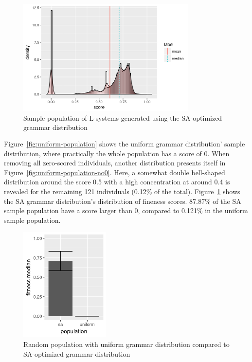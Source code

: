 \begin{figure}
    \centering
    \includegraphics[width=0.8\textwidth]{figures/sa-population}
    \caption[L-system population from SA grammar distribution]{Sample population of \glspl{L-system} generated using the \gls{SA}-optimized grammar distribution}
    \label{fig:sa-population}
\end{figure}

Figure~\ref{fig:uniform-population} shows the uniform grammar distribution' sample distribution, where practically the whole population has a score of 0.
When removing all zero-scored individuals, another distribution presents itself in Figure~\ref{fig:uniform-population-no0}.
Here, a somewhat double bell-shaped distribution around the score 0.5 with a high concentration at around 0.4 is revealed for the remaining 121 individuals (0.12\% of the total).
Figure~\ref{fig:sa-population} shows the \gls{SA} grammar distribution's distribution of fineness scores.
87.87\% of the \gls{SA} sample population have a score larger than 0, compared to 0.121\% in the uniform sample population.

\begin{figure}
    \centering
    \includegraphics[width=0.4\textwidth]{figures/sa-uniform}
    \caption[Uniform compared to SA-optimized grammar distribution]{Random population with uniform grammar distribution compared to \gls{SA}-optimized grammar distribution}
    \label{fig:sa-uniform}
\end{figure}

